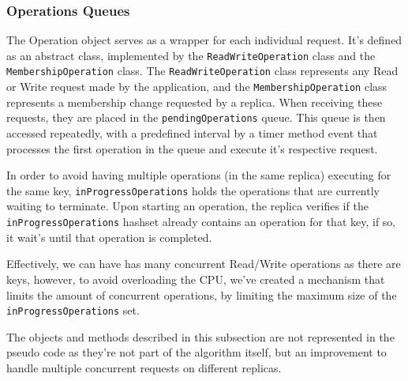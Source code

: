\documentclass[10pt,a4paper,twocolumn]{article}
\begin{document}
\subsubsection{Operations Queues}
\label{sec:operatioQ}
The Operation object serves as a wrapper for each individual request. It's defined as an abstract class, implemented by the \verb|ReadWriteOperation| class and the \verb|MembershipOperation| class. The \verb|ReadWriteOperation| class represents any Read or Write request made by the application, and the \verb|MembershipOperation| class represents a membership change requested by a replica. When receiving these requests, they are placed in the \verb|pendingOperations| queue. This queue is then accessed repeatedly, with a predefined interval by a timer method event that processes the first operation in the queue and execute it's respective request.
\par In order to avoid having multiple operations (in the same replica) executing for the same key, \verb|inProgressOperations| holds the operations that are currently waiting to terminate. Upon starting an operation, the replica verifies if the \verb|inProgressOperations| hashset already contains an operation for that key, if so, it wait's until that operation is completed.
\par Effectively, we can have has many concurrent Read/Write operations as there are keys, however, to avoid overloading the CPU, we've created a mechanism that limits the amount of concurrent operations, by limiting the maximum size of the \verb|inProgressOperations| set.
\par The objects and methods described in this subsection are not represented in the pseudo code as they're not part of the algorithm itself, but an improvement to handle multiple concurrent requests on different replicas.
\end{document}
